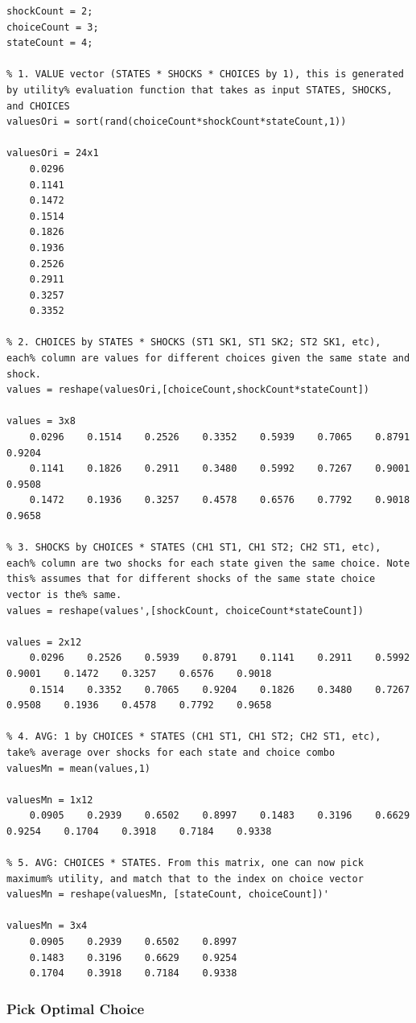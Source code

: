 \documentclass[
]{book}
\begin{document}
\begin{verbatim}
shockCount = 2;
choiceCount = 3;
stateCount = 4;

% 1. VALUE vector (STATES * SHOCKS * CHOICES by 1), this is generated by utility% evaluation function that takes as input STATES, SHOCKS, and CHOICES
valuesOri = sort(rand(choiceCount*shockCount*stateCount,1))

valuesOri = 24x1    
    0.0296
    0.1141
    0.1472
    0.1514
    0.1826
    0.1936
    0.2526
    0.2911
    0.3257
    0.3352

% 2. CHOICES by STATES * SHOCKS (ST1 SK1, ST1 SK2; ST2 SK1, etc), each% column are values for different choices given the same state and shock.
values = reshape(valuesOri,[choiceCount,shockCount*stateCount])

values = 3x8    
    0.0296    0.1514    0.2526    0.3352    0.5939    0.7065    0.8791    0.9204
    0.1141    0.1826    0.2911    0.3480    0.5992    0.7267    0.9001    0.9508
    0.1472    0.1936    0.3257    0.4578    0.6576    0.7792    0.9018    0.9658

% 3. SHOCKS by CHOICES * STATES (CH1 ST1, CH1 ST2; CH2 ST1, etc), each% column are two shocks for each state given the same choice. Note this% assumes that for different shocks of the same state choice vector is the% same.
values = reshape(values',[shockCount, choiceCount*stateCount])

values = 2x12    
    0.0296    0.2526    0.5939    0.8791    0.1141    0.2911    0.5992    0.9001    0.1472    0.3257    0.6576    0.9018
    0.1514    0.3352    0.7065    0.9204    0.1826    0.3480    0.7267    0.9508    0.1936    0.4578    0.7792    0.9658

% 4. AVG: 1 by CHOICES * STATES (CH1 ST1, CH1 ST2; CH2 ST1, etc), take% average over shocks for each state and choice combo
valuesMn = mean(values,1)

valuesMn = 1x12    
    0.0905    0.2939    0.6502    0.8997    0.1483    0.3196    0.6629    0.9254    0.1704    0.3918    0.7184    0.9338

% 5. AVG: CHOICES * STATES. From this matrix, one can now pick maximum% utility, and match that to the index on choice vector
valuesMn = reshape(valuesMn, [stateCount, choiceCount])'

valuesMn = 3x4    
    0.0905    0.2939    0.6502    0.8997
    0.1483    0.3196    0.6629    0.9254
    0.1704    0.3918    0.7184    0.9338
\end{verbatim}

\hypertarget{pick-optimal-choice}{%
\subsubsection{\texorpdfstring{\textbf{Pick Optimal Choice}}{Pick Optimal Choice}}\label{pick-optimal-choice}}
\end{document}
